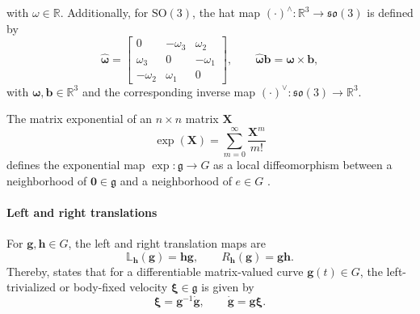 with $\omega \in \mathbb{R}$.
Additionally, for \(\mathrm{SO}(3)\), the hat map \((\cdot)^{\wedge}:\mathbb{R}^{3}\rightarrow\mathfrak{so}(3)\) is defined by
\begin{equation}
    \widehat{\bm{\omega}}
    =
    \begin{bmatrix}
        0 & -\omega_{3} & \omega_{2}\\
        \omega_{3} & 0 & -\omega_{1}\\
        -\omega_{2} & \omega_{1} & 0
    \end{bmatrix},
    \qquad
    \widehat{\bm{\omega}}\bm{b}=\bm{\omega}\times\bm{b},
    \label{eq:hat_map_so3}
\end{equation}
with $\bm{\omega}, \bm{b} \in \mathbb{R}^3$ and the corresponding inverse map \((\cdot)^{\vee}: \mathfrak{so}(3) \rightarrow \mathbb{R}^3\).

The matrix exponential of an $n\times n$ matrix $\bm{X}$
\begin{equation}
    \exp(\bm{X})=\sum_{m=0}^{\infty} \frac{\bm{X}^m}{m!}
    \label{eq:matrix_exponential}
\end{equation}
defines the exponential map \(\exp:\mathfrak{g}\rightarrow G\) as a local diffeomorphism between a neighborhood of \(\bm{0}\in\mathfrak{g}\) and a neighborhood of \(e\in G\) \cite{Hall2000LieGroups,Lee2008}.

\paragraph{Left and right translations}
For \(\bm{g},\bm{h}\in G\), the left and right translation maps are
\begin{equation}
    \mathbb{L}_{\bm{h}}(\bm{g})=\bm{h}\bm{g},
    \qquad
    R_{\bm{h}}(\bm{g})=\bm{g}\bm{h}.
    \label{eq:left_right_translation}
\end{equation}
Thereby, \cite{Lee2008} states that for a differentiable matrix-valued curve $\bm{g}(t) \in G$, the left-trivialized or body-fixed velocity $\bm{\xi} \in \mathfrak{g}$ is given by
\begin{equation}
    \bm{\xi}=\bm{g}^{-1}\dot{\bm{g}},
    \qquad
    \dot{\bm{g}}=\bm{g}\bm{\xi}.
    \label{eq:left_trivialized_velocity}
\end{equation}

